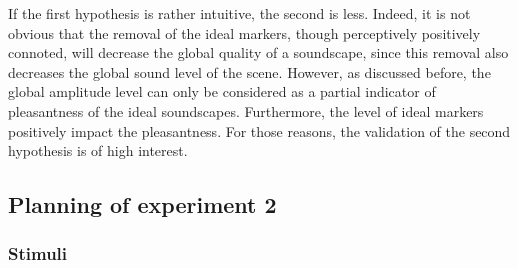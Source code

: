 \documentclass[12pt]{elsarticle}
\begin{document}


If the first hypothesis is rather intuitive, the second is less. Indeed, it is not obvious that the removal of the ideal markers, though perceptively positively connoted, will decrease the global quality of a soundscape, since this removal also decreases the global sound level of the scene. However, as discussed before, the global amplitude level can only be considered as a partial indicator of pleasantness of the ideal soundscapes. Furthermore, the level of ideal markers positively impact the pleasantness. For those reasons, the validation of the second hypothesis is of high interest.

\subsection{Planning of experiment 2}

\subsubsection*{Stimuli}

\end{document}

